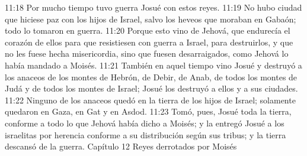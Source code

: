 11:18 Por mucho tiempo tuvo guerra Josué con estos reyes.  
11:19 No hubo ciudad que hiciese paz con los hijos de Israel, salvo los heveos que moraban en Gabaón; todo lo tomaron en guerra.  
11:20 Porque esto vino de Jehová, que endurecía el corazón de ellos para que resistiesen con guerra a Israel, para destruirlos, y que no les fuese hecha misericordia, sino que fuesen desarraigados, como Jehová lo había mandado a Moisés. 
11:21 También en aquel tiempo vino Josué y destruyó a los anaceos de los montes de Hebrón, de Debir, de Anab, de todos los montes de Judá y de todos los montes de Israel; Josué los destruyó a ellos y a sus ciudades.  
11:22 Ninguno de los anaceos quedó en la tierra de los hijos de Israel; solamente quedaron en Gaza, en Gat y en Asdod.  
11:23 Tomó, pues, Josué toda la tierra, conforme a todo lo que Jehová había dicho a Moisés; y la entregó Josué a los israelitas por herencia conforme a su distribución según sus tribus; y la tierra descansó de la guerra.  
Capítulo 12
Reyes derrotados por Moisés  

